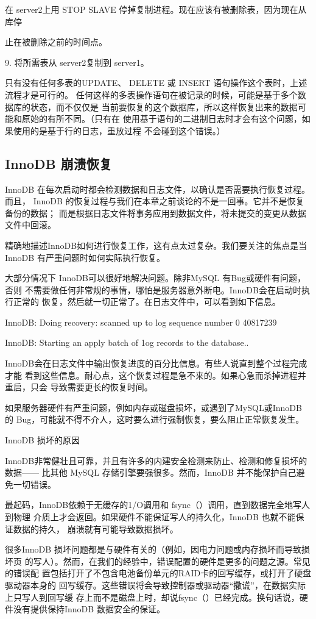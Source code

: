 在 server2上用 STOP SLAVE 停掉复制进程。现在应该有被删除表，因为现在从库停

止在被删除之前的时间点。

9. 将所需表从 server2复制到 server1。

只有没有任何多表的UPDATE、 DELETE 或 INSERT 语句操作这个表时，上述流程才是可行的。
任何这样的多表操作语句在被记录的时候，可能是基于多个数据库的状态，而不仅仅是
当前要恢复的这个数据库，所以这样恢复出来的数据可能和原始的有所不同。（只有在
使用基于语句的二进制日志时才会有这个问题，如果使用的是基于行的日志，重放过程
不会碰到这个错误。）

\subsection{InnoDB 崩溃恢复}
InnoDB 在每次启动时都会检测数据和日志文件，以确认是否需要执行恢复过程。而且，
InnoDB 的恢复过程与我们在本章之前谈论的不是一回事。它并不是恢复备份的数据；
而是根据日志文件将事务应用到数据文件，将未提交的变更从数据文件中回滚。

精确地描述InnoDB如何进行恢复工作，这有点太过复杂。我们要关注的焦点是当
InnoDB 有严重问题时如何实际执行恢复。

大部分情况下 InnoDB可以很好地解决问题。除非MySQL 有Bug或硬件有问题，否则
不需要做任何非常规的事情，哪怕是服务器意外断电。InnoDB会在启动时执行正常的
恢复，然后就一切正常了。在日志文件中，可以看到如下信息。

InnoDB: Doing recovery: scanned up to log sequence number 0 40817239

InnoDB: Starting an apply batch of 1og records to the database..

InnoDB会在日志文件中输出恢复进度的百分比信息。有些人说直到整个过程完成才能
看到这些信息。耐心点，这个恢复过程是急不来的。如果心急而杀掉进程并重启，只会
导致需要更长的恢复时间。

如果服务器硬件有严重问题，例如内存或磁盘损坏，或遇到了MySQL或InnoDB 的
Bug，可能就不得不介人，这时要么进行强制恢复，要么阻止正常恢复发生。

InnoDB 损坏的原因

InnoDB非常健壮且可靠，并且有许多的内建安全检测来防止、检测和修复损坏的数据——
比其他 MySQL 存储引擎要强很多。然而，InnoDB 并不能保护自己避免一切错误。

最起码，InnoDB依赖于无缓存的1/O调用和 fsync（）调用，直到数据完全地写人到物理
介质上才会返回。如果硬件不能保证写人的持久化，InnoDB 也就不能保证数据的持久，
崩溃就有可能导致数据损坏。

很多InnoDB 损坏问题都是与硬件有关的（例如，因电力问题或内存损坏而导致损坏页
的写人）。然而，在我们的经验中，错误配置的硬件是更多的问题之源。常见的错误配
置包括打开了不包含电池备份单元的RAID卡的回写缓存，或打开了硬盘驱动器本身的
回写缓存。这些错误将会导致控制器或驱动器“撒谎”，在数据实际上只写人到回写缓
存上而不是磁盘上时，却说fsync（）已经完成。换句话说，硬件没有提供保持InnoDB
数据安全的保证。

